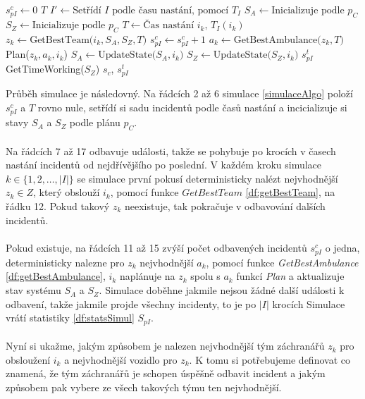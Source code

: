 \begin{algorithm}
  \begin{algorithmic}[1]  %
    \State $s^{c}_{pI} \gets 0$
    \State $T$ 
    \State $I' \gets \mbox{Setřídí $I$ podle času nastání, pomocí $T_I$}$
    \State $S_A \gets \mbox{Inicializuje podle $p_C$}$
    \State $S_Z \gets \mbox{Inicializuje podle $p_C$}$
      \State $T \gets \mbox{Čas nastání $i_k$, $T_I(i_k)$}$
      \State $z_k \gets \mbox{GetBestTeam($i_k, S_A, S_Z, T$)}$
        \State $s^{c}_{pI} \gets s^{c}_{pI} + 1$
        \State $a_k \gets \mbox{GetBestAmbulance($z_k, T$)}$
        \State Plan($z_k, a_k, i_k$)
        \State $S_A \gets \mbox{UpdateState($S_A, i_k$)}$
        \State $S_Z \gets \mbox{UpdateState($S_Z, i_k$)}$
      \EndIf
    \EndFor
    \State $s^t_{pI}$ \gets \mbox{GetTimeWorking($S_Z$)}
    \State \Return $s_{c}$, $s^t_{pI}$
  \EndFunction
  \end{algorithmic}
  \caption{}
  \label{simulaceAlgo}
\end{algorithm}

\vspace*{20px}

Průběh simulace je následovný. 
Na řádcích 2 až 6 simulace \ref{simulaceAlgo} položí $s^{c}_{pI}$ a $T$ rovno nule, setřídí si sadu incidentů podle časů nastání
a incicializuje si stavy $S_A$ a $S_Z$ podle plánu $p_C$.
\\
\\
Na řádcích 7 až 17 odbavuje události, takže se pohybuje po krocích v časech nastání incidentů od nejdřívějšího po poslední.
V každém kroku simulace $k \in \{ 1, 2, \dots , |I|\}$ se simulace první pokusí deterministicky nalézt nejvhodnější $z_k \in Z$, který obslouží $i_k$,
pomocí funkce $\textit{GetBestTeam}$ \ref{df:getBestTeam}, na řádku 12.
Pokud takový $z_k$ neexistuje, tak pokračuje v odbavování dalších incidentů.
\\
\\
Pokud existuje, na řádcích 11 až 15 zvýší počet odbavených incidentů $s^c_{pI}$ o jedna,
deterministicky nalezne pro $z_k$ nejvhodnější $a_k$, pomocí funkce \textit{GetBestAmbulance} \ref{df:getBestAmbulance},
$i_k$ naplánuje na $z_k$ spolu s $a_k$ funkcí \textit{Plan} a aktualizuje stav systému $S_A$ a $S_Z$.
Simulace doběhne jakmile nejsou žádné další události k odbavení, takže jakmile projde všechny incidenty, to je po $|I|$ krocích
Simulace vrátí statistiky \ref{df:statsSimul} $S_{pI}$.
\\
\\
Nyní si ukažme, jakým způsobem je nalezen nejvhodnější tým záchranářů $z_k$ pro obsloužení $i_k$ a nejvhodnější vozidlo pro $z_k$.
K tomu si potřebujeme definovat co znamená, že tým záchranářů je schopen úspěšně odbavit incident a jakým způsobem pak vybere ze všech takových týmu ten nejvhodnější.

